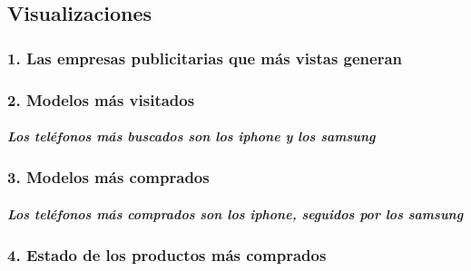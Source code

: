 \documentclass[11pt]{article}
\begin{document}
    \hypertarget{visualizaciones}{%
\subsection{Visualizaciones}\label{visualizaciones}}

    \hypertarget{las-empresas-publicitarias-que-muxe1s-vistas-generan}{%
\subsubsection{1. Las empresas publicitarias que más vistas
generan}\label{las-empresas-publicitarias-que-muxe1s-vistas-generan}}

    \begin{center}
    \end{center}
    \hypertarget{modelos-muxe1s-visitados}{%
\subsubsection{2. Modelos más
visitados}\label{modelos-muxe1s-visitados}}

    \begin{center}
    \end{center}

    \hypertarget{los-teluxe9fonos-muxe1s-buscados-son-los-iphone-y-los-samsung}{%
\subparagraph{Los teléfonos más buscados son los iphone y los
samsung}\label{los-teluxe9fonos-muxe1s-buscados-son-los-iphone-y-los-samsung}}

    \hypertarget{modelos-muxe1s-comprados}{%
\subsubsection{3. Modelos más
comprados}\label{modelos-muxe1s-comprados}}

    \begin{center}
    \end{center}
    
    \hypertarget{los-teluxe9fonos-muxe1s-comprados-son-los-iphone-seguidos-por-los-samsung}{%
\subparagraph{Los teléfonos más comprados son los iphone, seguidos por
los
samsung}\label{los-teluxe9fonos-muxe1s-comprados-son-los-iphone-seguidos-por-los-samsung}}

    \hypertarget{estado-de-los-productos-muxe1s-comprados}{%
\subsubsection{4. Estado de los productos más
comprados}\label{estado-de-los-productos-muxe1s-comprados}}
\end{document}
